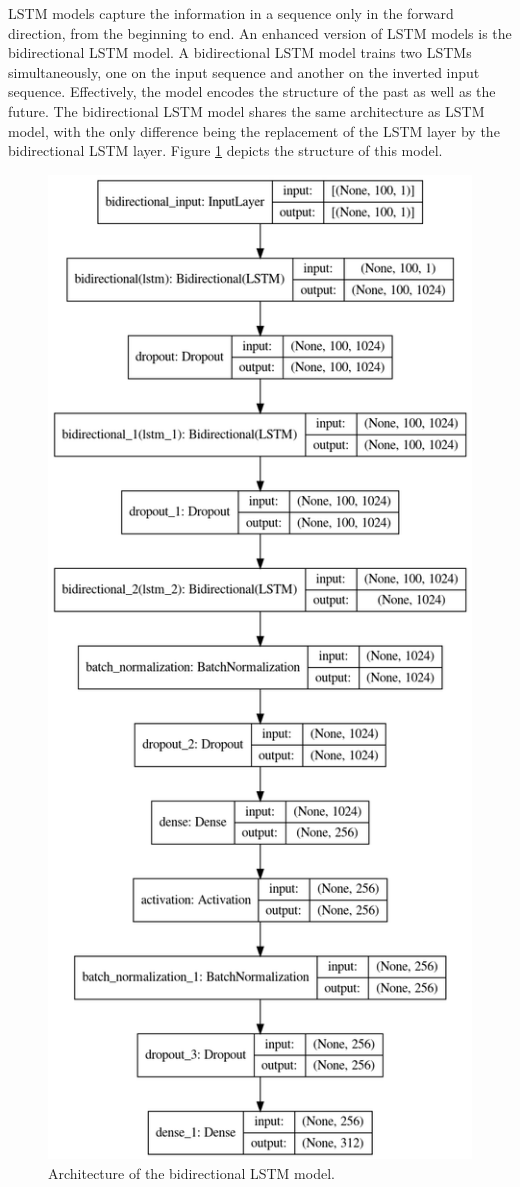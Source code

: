 \documentclass[sigconf,authorversion]{acmart}
\begin{document}
LSTM models capture the information in a sequence only in the forward direction,
from the beginning to end. An enhanced version of LSTM models is the bidirectional 
LSTM model. A bidirectional LSTM model trains two LSTMs simultaneously, one on the 
input sequence and another on the inverted input sequence. Effectively, the model 
encodes the structure of the past as well as the future. The bidirectional LSTM
model shares the same architecture as LSTM model, with the only difference being
the replacement of the LSTM layer by the bidirectional LSTM layer. Figure 
\ref{bidirect_lstm_model} depicts the structure of this model.

\begin{figure}[h]
  \centering
  \includegraphics[width=0.7\linewidth]{bidirect_lstm_model.png}
  \caption{Architecture of the bidirectional LSTM model.}
  \label{bidirect_lstm_model}
\end{figure}
\end{document}
